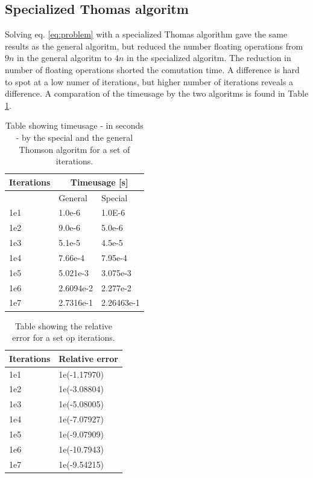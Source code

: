 \documentclass[twoside,twocolumn]{article}
\begin{document}
\subsection{Specialized Thomas algoritm}
Solving eq. \ref{eq:problem} with a specialized Thomas algorithm gave the same results as the general algoritm, but reduced the number floating operations from $9n$ in the general algoritm to $4n$ in the specialized algoritm. The reduction in number of floating operations shorted the comutation time. A difference is hard to spot at a low numer of iterations, but higher number of iterations reveals a difference. A comparation of the timeusage by the two algoritms is found in Table \ref{tbl:ThompsonTime}.
\begin{table}[htp]
\centering
\begin{tabular}{|l|l|l|} \hline
Iterations & \multicolumn{2}{|c|}{Timeusage [s]}\\ \hline
 	& General 	& Special\\ \hline
1e1	& 1.0e-6	& 1.0E-6\\
1e2 & 9.0e-6	& 5.0e-6\\
1e3 & 5.1e-5	& 4.5e-5\\
1e4 & 7.66e-4	& 7.95e-4\\
1e5 & 5.021e-3	& 3.075e-3\\
1e6 & 2.6094e-2	&2.277e-2\\
1e7 & 2.7316e-1	& 2.26463e-1 \\ \hline
\end{tabular}
\caption{Table showing timeusage - in seconds - by the special and the general Thomson algoritm for a set of iterations.} \label{tbl:ThompsonTime}
\end{table}



\begin{table}[htp]
\centering
\begin{tabular}{|l|l|} \hline
Iterations & Relative error\\ \hline
1e1 & 1e(-1.17970)\\
1e2 & 1e(-3.08804)\\
1e3 & 1e(-5.08005)\\
1e4 & 1e(-7.07927)\\
1e5 & 1e(-9.07909)\\
1e6 & 1e(-10.7943)\\
1e7 & 1e(-9.54215)\\ \hline
\end{tabular}
\caption{Table showing the relative error for a set op iterations.}
\end{table}
\end{document}
